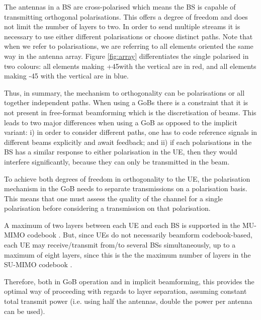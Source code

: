 The antennas in a BS are cross-polarised \cite{3gpp-antennas} which means the BS is capable of transmitting orthogonal polarisations. This offers a degree of freedom and does not limit the number of layers to two. In order to send multiple streams it is necessary to use either different polarisations or choose distinct paths. Note that when we refer to polarisations, we are referring to all elements oriented the same way in the antenna array. Figure \ref{fig:array} differentiates the single polarised in two colours: all elements making +45\textdegree with the vertical are in red, and all elements making -45 \textdegree with the vertical are in blue.



Thus, in summary, the mechanism to orthogonality can be polarisations or all together independent paths. When using a GoBs there is a constraint that it is not present in free-format beamforming which is the discretisation of beams. This leads to two major differences when using a GoB as opposed to the implicit variant: i) in order to consider different paths, one has to code reference signals in different beams explicitly and await feedback; and ii) if each polarisations in the BS has a similar response to either polarisation in the UE, then they would interfere significantly, because they can only be transmitted in the beam.

To achieve both degrees of freedom in orthogonality to the UE, the polarisation mechanism in the GoB needs to separate transmissions on a polarisation basis. This means that one must assess the quality of the channel for a single polarisation before considering a transmission on that polarisation. 


A maximum of two layers between each UE and each BS is supported in the MU-MIMO codebook \cite{3gpp-codebooks}. But, since UEs do not necessarily beamform codebook-based, each UE may receive/transmit from/to several BSs simultaneously, up to a maximum of eight layers, since this is the the maximum number of layers in the SU-MIMO codebook \cite{3gpp-codebooks}.


Therefore, both in GoB operation and in implicit beamforming, this provides the optimal way of proceeding with regards to layer separation, assuming constant total transmit power (i.e. using half the antennas, double the power per antenna can be used).






